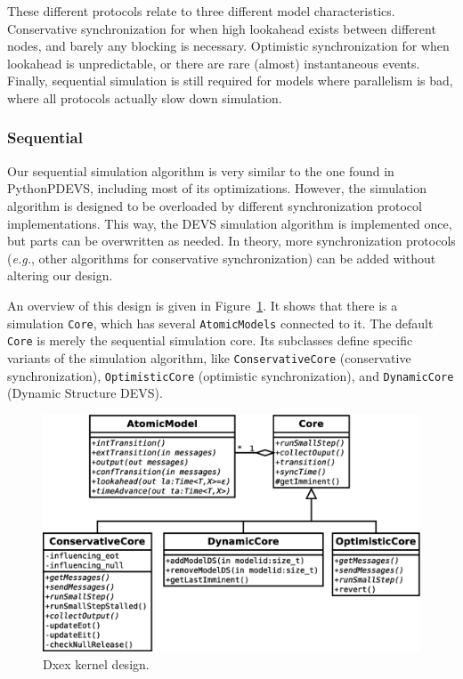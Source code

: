 These different protocols relate to three different model characteristics.
Conservative synchronization for when high lookahead exists between different nodes, and barely any blocking is necessary.
Optimistic synchronization for when lookahead is unpredictable, or there are rare (almost) instantaneous events.
Finally, sequential simulation is still required for models where parallelism is bad, where all protocols actually slow down simulation.

\subsubsection{Sequential}
Our sequential simulation algorithm is very similar to the one found in PythonPDEVS, including most of its optimizations.
However, the simulation algorithm is designed to be overloaded by different synchronization protocol implementations.
This way, the \textsf{DEVS} simulation algorithm is implemented once, but parts can be overwritten as needed.
In theory, more synchronization protocols (\textit{e.g.}, other algorithms for conservative synchronization) can be added without altering our design.

An overview of this design is given in Figure~\ref{fig:class_diagram}.
It shows that there is a simulation \texttt{Core}, which has several \texttt{AtomicModels} connected to it.
The default \texttt{Core} is merely the sequential simulation core.
Its subclasses define specific variants of the simulation algorithm, like \texttt{ConservativeCore} (conservative synchronization), \texttt{OptimisticCore} (optimistic synchronization), and \texttt{DynamicCore} (\textsf{Dynamic Structure DEVS}).

\begin{figure}
    \includegraphics[width=\columnwidth]{fig/cores_class_diagram.eps}
	\caption{Dxex kernel design.}
	\label{fig:class_diagram}
\end{figure}

